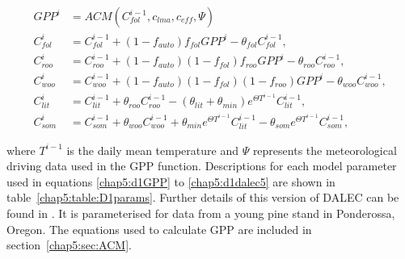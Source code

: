 \begin{align}
GPP^{i} &= ACM(C_{fol}^{i-1}, c_{lma}, c_{eff}, \Psi) \label{chap5:d1GPP}
\\C_{fol}^{i}&=C_{fol}^{i-1}+(1-f_{auto})f_{fol}GPP^{i}-\theta_{fol}C_{fol}^{i-1},
\\C_{roo}^{i}&=C_{roo}^{i-1}+(1-f_{auto})(1-f_{fol})f_{roo}GPP^{i}-\theta_{roo}C_{roo}^{i-1}, 
\\C_{woo}^{i}&=C_{woo}^{i-1}+(1-f_{auto})(1-f_{fol})(1-f_{roo})GPP^{i}-\theta_{woo}C_{woo}^{i-1}, 
\\C_{lit}^{i}&=C_{lit}^{i-1}+\theta_{roo}C_{roo}^{i-1}-(\theta_{lit}+\theta_{min})e^{\Theta T^{i-1}}C_{lit}^{i-1}, 
\\C_{som}^{i}&=C_{som}^{i-1}+\theta_{woo}C_{woo}^{i-1}+\theta_{min}e^{\Theta T^{i-1}}C_{lit}^{i-1}-\theta_{som}e^{\Theta T^{i-1}}C_{som}^{i-1}, \label{chap5:d1dalec5}
\end{align}

where $T^{i-1}$ is the daily mean temperature and $\Psi$ represents the meteorological driving data used in the GPP function. Descriptions for each model parameter used in equations \eqref{chap5:d1GPP} to \eqref{chap5:d1dalec5} are shown in table~\ref{chap5:table:D1params}. Further details of this version of DALEC can be found in \cite{williams2005improved}. It is parameterised for data from a young pine stand in Ponderossa, Oregon. The equations used to calculate GPP are included in section~\ref{chap5:sec:ACM}. 

